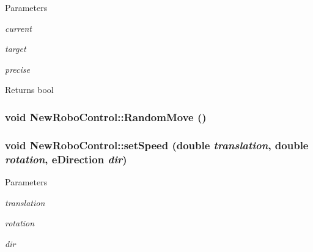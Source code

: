 \begin{DoxyParams}{Parameters}
\item[{\em current}]\item[{\em target}]\item[{\em precise}]\end{DoxyParams}
\begin{DoxyReturn}{Returns}
bool 
\end{DoxyReturn}
\hypertarget{classNewRoboControl_ab3231acd7efd60677b4f48b094cb6dd3}{
\subsubsection[{RandomMove}]{\setlength{\rightskip}{0pt plus 5cm}void NewRoboControl::RandomMove ()}}
\label{classNewRoboControl_ab3231acd7efd60677b4f48b094cb6dd3}
\hypertarget{classNewRoboControl_ad2ddddb5f0272a733021524ebaaaeffd}{
\subsubsection[{setSpeed}]{\setlength{\rightskip}{0pt plus 5cm}void NewRoboControl::setSpeed (double {\em translation}, \/  double {\em rotation}, \/  {\bf eDirection} {\em dir})}}
\label{classNewRoboControl_ad2ddddb5f0272a733021524ebaaaeffd}

\begin{DoxyParams}{Parameters}
\item[{\em translation}]\item[{\em rotation}]\item[{\em dir}]\end{DoxyParams}


